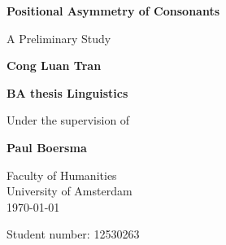 \begin{titlepage}
    \begin{center}
        \vspace*{1cm}
        
        \Huge
        \textbf{Positional Asymmetry of Consonants}
            
        \vspace{0.5cm}
        \LARGE
        A Preliminary Study 
            
        \vspace{1.5cm}
            
        \textbf{Cong Luan Tran}
            
        \vfill
        \LARGE
        \textbf{BA thesis Linguistics}\\
        
        \vspace{0.5cm}
        
        \Large 
        Under the supervision of 
        
        \vspace{0.5cm}
        \LARGE
        \textbf{Paul Boersma}
        
        \vspace{0.8cm}
            
            
        \Large
        Faculty of Humanities\\
        University of Amsterdam\\
        \today
        
        \vfill
    \end{center}
\begin{flushright}
Student number: 12530263
\end{flushright}
\end{titlepage}